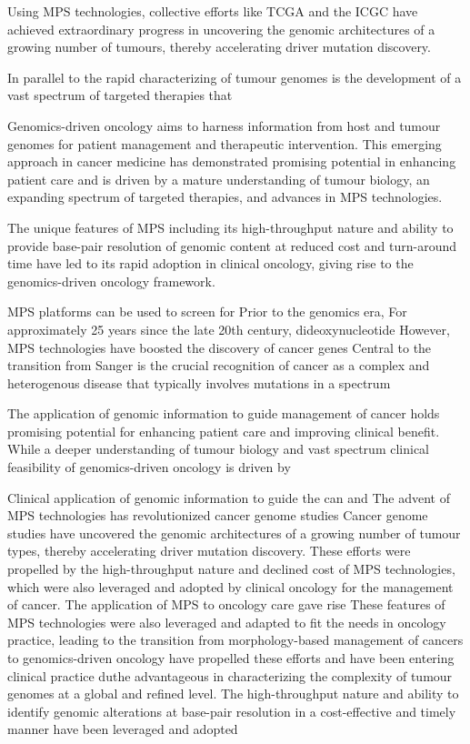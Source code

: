 Using MPS technologies, collective efforts like TCGA and the ICGC have achieved extraordinary progress in uncovering the genomic architectures of a growing number of tumours, thereby accelerating driver mutation discovery.

In parallel to the rapid characterizing of tumour genomes is the development of a vast spectrum of targeted therapies that

Genomics-driven oncology aims to harness information from host and tumour genomes for patient management and therapeutic intervention. This emerging approach in cancer medicine has demonstrated promising potential in enhancing patient care and is driven by a mature understanding of tumour biology, an expanding spectrum of targeted therapies, and advances in MPS technologies.

The unique features of MPS including its high-throughput nature and ability to provide base-pair resolution of genomic content at reduced cost and turn-around time have led to its rapid adoption in clinical oncology, giving rise to the genomics-driven oncology framework.

MPS platforms can be used to screen for Prior to the genomics era, For approximately 25 years since the late 20th century, dideoxynucleotide However, MPS technologies have boosted the discovery of cancer genes Central to the transition from Sanger  is the crucial recognition of cancer as a complex and heterogenous disease that typically involves mutations in a spectrum

The application of genomic information to guide management of cancer holds promising potential for enhancing patient care and improving clinical benefit. While a deeper understanding of tumour biology and vast spectrum clinical feasibility of genomics-driven oncology is driven by

Clinical application of genomic information to guide the can and The advent of MPS technologies has revolutionized cancer genome studies
Cancer genome studies have uncovered the genomic architectures of a growing number of tumour types, thereby accelerating driver mutation discovery. These efforts were propelled by the high-throughput nature and declined cost of MPS technologies, which were also leveraged and adopted by clinical oncology for the management of cancer. The application of MPS to oncology care gave rise   These features of MPS technologies were also leveraged and adapted to fit the needs in oncology practice, leading to the transition from morphology-based management of cancers to genomics-driven oncology  have propelled these efforts and have been entering clinical practice duthe advantageous in characterizing the complexity of tumour genomes at a global and refined level. The high-throughput nature and ability to identify genomic alterations at base-pair resolution in a cost-effective and timely manner have been leveraged and adopted

